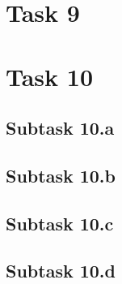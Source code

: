 \documentclass[a4paper,10pt]{article}
\begin{document}
\clearpage\newpage
\section*{Task 9}


\clearpage\newpage
\section*{Task 10}

\subsection*{Subtask 10.a}

\subsection*{Subtask 10.b}

\subsection*{Subtask 10.c}

\subsection*{Subtask 10.d}


\end{document}
